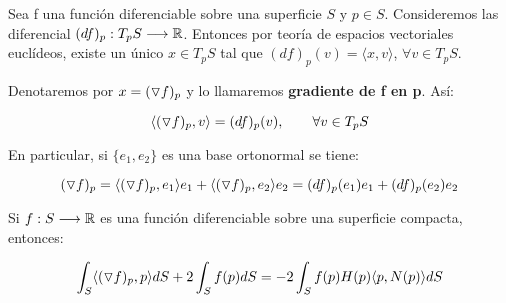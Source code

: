 \begin{definition}[Gradiente]
Sea f una función diferenciable sobre una superficie $S$ y $p \in S$. Consideremos las diferencial $(df)_p: T_pS \longrightarrow \mathbb{R}$. Entonces por teoría de espacios vectoriales euclídeos, existe un único $x \in T_pS$ tal que $(df)_p(v)=  \langle x,v \rangle $, $\forall v \in T_pS$.

Denotaremos por $x= (\triangledown f)_p $ y lo llamaremos \textbf{gradiente de f en p}. Así:

\begin{equation*}
    \langle (\triangledown f)_p, v \rangle = (df)_p(v), \qquad \forall v \in T_pS
\end{equation*}

En particular, si $\{e_1, e_2\}$ es una base ortonormal se tiene:

\begin{equation*}
     (\triangledown f)_p = \langle  (\triangledown f)_p , e_1 \rangle e_1 + \langle (\triangledown f)_p, e_2 \rangle e_2 = (df)_p(e_1)e_1 + (df)_p(e_2)e_2
\end{equation*}
\end{definition}

\begin{corolario}\label{corolariogradiente}
Si $f: S \longrightarrow \mathbb{R}$ es una función diferenciable sobre una superficie compacta, entonces:

\begin{equation*}
    \int_S \langle (\triangledown f)_p, p \rangle dS + 2 \int_S f(p)dS = -2 \int_S f(p)H(p) \langle p, N(p) \rangle dS
\end{equation*}
\end{corolario}
